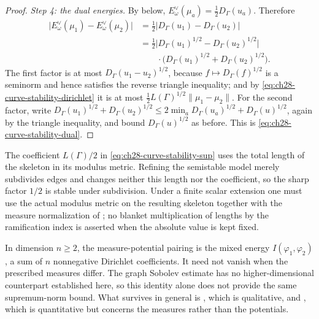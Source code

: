 \begin{proof}
\emph{Step 4: the dual energies.}  By
 below,
$E^\vee_\omega(\mu_a)=\tfrac12D_\Gamma(u_a)$.  Therefore
\[
 \begin{aligned}
 \bigl|E^\vee_\omega(\mu_1)-E^\vee_\omega(\mu_2)\bigr|
 &=\tfrac12\bigl|D_\Gamma(u_1)-D_\Gamma(u_2)\bigr|\\
 &=\tfrac12\bigl|D_\Gamma(u_1)^{1/2}-D_\Gamma(u_2)^{1/2}\bigr|\\
 &\qquad\cdot
   \bigl(D_\Gamma(u_1)^{1/2}+D_\Gamma(u_2)^{1/2}\bigr).
 \end{aligned}
\]
The first factor is at most $D_\Gamma(u_1-u_2)^{1/2}$, because
$f\mapsto D_\Gamma(f)^{1/2}$ is a seminorm and hence satisfies the reverse
triangle inequality; and by
\eqref{eq:ch28-curve-stability-dirichlet} it is at most
$\tfrac12L(\Gamma)^{1/2}\lVert\mu_1-\mu_2\rVert$.  For the second factor, write
$D_\Gamma(u_1)^{1/2}+D_\Gamma(u_2)^{1/2}
\leq 2\min_aD_\Gamma(u_a)^{1/2}+D_\Gamma(u)^{1/2}$, again by the triangle
inequality, and bound $D_\Gamma(u)^{1/2}$ as before.  This is
\eqref{eq:ch28-curve-stability-dual}.
\end{proof}

\begin{remark}
\label{rem:ch28-curve-constant}
The coefficient $L(\Gamma)/2$ in
\eqref{eq:ch28-curve-stability-sup} uses the total length of the skeleton in
its modulus metric.  Refining the semistable model merely subdivides edges
and changes neither this length nor the coefficient, so the sharp factor
$1/2$ is stable under subdivision.  Under a finite scalar extension one
must use the actual modulus metric on the resulting skeleton together with
the measure normalization of ; no blanket
multiplication of lengths by the ramification index is asserted when the
absolute value is kept fixed.

In dimension $n\geq2$, the measure-potential pairing is the mixed
energy $I(\varphi_1,\varphi_2)$, a sum of $n$ nonnegative Dirichlet
coefficients.  It need not vanish when the prescribed measures differ.
The graph Sobolev estimate has no higher-dimensional counterpart
established here, so this identity alone does not provide the same
supremum-norm bound.  What survives in
general is , which is qualitative, and
, which is quantitative but
concerns the measures rather than the potentials.
\end{remark}


